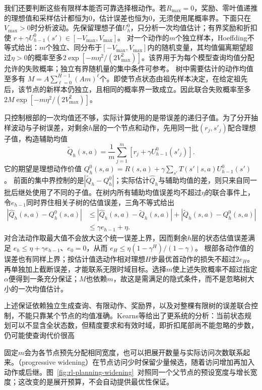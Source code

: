 我们还要判断这些有限样本能否可靠选择根动作。若$R_{\max}=0$，奖励、零叶值递推的理想值和采样估计都恒为0，估计误差也恒为0，无须使用尾概率界。下面只在$V_{\max}>0$时分析波动。先保留理想子值$U_h^0$，只分析一次均值估计；有界奖励和折扣使
$r+\gamma U_{h-1}^0(s')\in[-V_{\max},V_{\max}]$。
对一个动作的$m$个独立样本，Hoeffding不等式给出：$m$个独立、同分布于$[-V_{\max},V_{\max}]$内的随机变量，其均值偏离期望超过$\eta>0$的概率至多$2\exp[-m\eta^2/(2V_{\max}^2)]$。该界用于为每个模型查询均值分配允许的失败概率；独立有界随机量的集中条件可参考。
树中需要估计的动作均值至多有
$M=A\sum_{\ell=0}^{H-1}(Am)^\ell$个。即使节点状态由祖先样本决定，在给定祖先后，该节点的新样本仍独立，且相同的概率界一致成立。因此联合失败概率至多
$2M\exp[-m\eta^2/(2V_{\max}^2)]$。

只控制根部的一次均值还不够，实际计算使用的是带误差的递归子值。为了分开抽样波动与子树误差，对剩余$h$层的一个节点和动作，先用同一批$(r_j,s'_j)$配合理想子值，构造辅助均值
\[
 \widetilde Q_h(s,a)=\frac1m\sum_{j=1}^{m}
       [r_j+\gamma U_{h-1}^0(s'_j)].
\]
它的期望是理想动作价值
$Q_h^0(s,a)=R(s,a)+\gamma\sum_{s'}T(s'\mid s,a)U_{h-1}^0(s')$。
前面的集中界控制的是$|\widetilde Q_h-Q_h^0|$；实际估计$\widehat Q_h$与辅助均值的差，则只来自同一批后继处使用了不同的子值。在树内所有辅助均值误差均不超过$\eta$的联合事件上，令$e_{h-1}$同时界住相关子树的估值误差，三角不等式给出
\[
 \begin{aligned}
 |\widehat Q_h(s,a)-Q_h^0(s,a)|
 &\leq |\widehat Q_h(s,a)-\widetilde Q_h(s,a)|
       +|\widetilde Q_h(s,a)-Q_h^0(s,a)|\\
 &\leq\gamma e_{h-1}+\eta.
 \end{aligned}
\]
对合法动作取最大值不会放大这个统一误差上界，因而剩余$h$层的状态估值误差满足
$e_h\leq\eta+\gamma e_{h-1}$、$e_0=0$，从而
$e_H\leq\eta(1-\gamma^H)/(1-\gamma)$。
根部各动作值的误差也有同样上界；按估计值选动作相对理想$H$步最优首动作的损失不超过$2e_H$。再单独加上截断误差，才能联系无限时域目标。选择$m$使上述失败概率不超过指定$\alpha$便得到一条充分保证；$M$也依赖$m$，故这是需满足的隐式条件，而不是忽略树大小的一次均值估计。

上述保证依赖独立生成查询、有限动作、奖励界，以及对整棵有限树的误差联合控制，不能只靠某个节点的均值准确。Kearns等给出了更系统的分析：当前状态规划可以不显含全状态数，但精度要求和有效时域，即折扣尾部尚不能忽略的步数，仍可能使查询代价很高

固定$m$会为各节点预先分配相同宽度，也可以把展开数量与实际访问次数联系起来。（progressive widening）在节点访问少时保留少量候选，随着访问增加再加入动作或后继。图~\ref{fig:rl-planning-widening}~对照同一个父节点的预设宽度与增长宽度；这改变的是展开预算，不会自动提供最优性保证。

